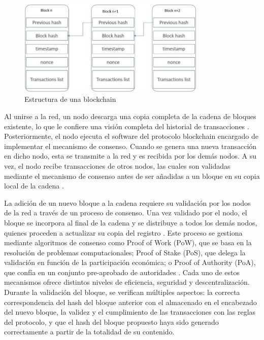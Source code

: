 \begin{figure}[h]
    \centering
    \includegraphics[width=0.8\textwidth]{Figures/blockchain-structure.png}
    \caption{Estructura de una blockchain}
    \label{fig:blockchain-structure}
\end{figure}

Al unirse a la red, un nodo descarga una copia completa de la cadena de bloques existente, lo que le confiere una visión completa del historial de transacciones \cite{bulkowska2023implementation}. Posteriormente, el nodo ejecuta el software del protocolo blockchain encargado de implementar el mecanismo de consenso. Cuando se genera una nueva transacción en dicho nodo, esta se transmite a la red y es recibida por los demás nodos. A su vez, el nodo recibe transacciones de otros nodos, las cuales son validadas mediante el mecanismo de consenso antes de ser añadidas a un bloque en su copia local de la cadena \cite{bulkowska2023implementation}.

La adición de un nuevo bloque a la cadena requiere su validación por los nodos de la red a través de un proceso de consenso. Una vez validado por el nodo, el bloque se incorpora al final de la cadena y se distribuye a todos los demás nodos, quienes proceden a actualizar su copia del registro \cite{bulkowska2023implementation}. Este proceso se gestiona mediante algoritmos de consenso como Proof of Work (PoW), que se basa en la resolución de problemas computacionales; Proof of Stake (PoS), que delega la validación en función de la participación económica; o Proof of Authority (PoA), que confía en un conjunto pre-aprobado de autoridades \cite{diaz2022protocolos}. Cada uno de estos mecanismos ofrece distintos niveles de eficiencia, seguridad y descentralización. Durante la validación del bloque, se verifican múltiples aspectos: la correcta correspondencia del hash del bloque anterior con el almacenado en el encabezado del nuevo bloque, la validez y el cumplimiento de las transacciones con las reglas del protocolo, y que el hash del bloque propuesto haya sido generado correctamente a partir de la totalidad de su contenido.

